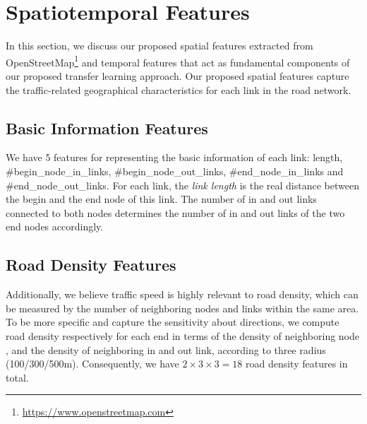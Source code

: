 \section{Spatiotemporal Features}
In this section, we discuss our proposed spatial features extracted from OpenStreetMap\footnote{\url{https://www.openstreetmap.com}} and temporal features that act as fundamental components of our proposed transfer learning approach. 
Our proposed spatial features capture the traffic-related geographical characteristics for each link in the  road network.

\subsection{Basic Information Features} 
We have 5 features for representing the basic information of each link: 
length, \#begin\_node\_in\_links, \#begin\_node\_out\_links, \#end\_node\_in\_links and \#end\_node\_out\_links.
For each link, the \textit{link length} is the real distance between the begin and the end node of this link. 
The number of in and out links connected to both nodes determines the number of in and out links of the two end nodes accordingly.


\subsection{Road Density Features}
Additionally, we believe traffic speed is highly relevant to road density, which can be measured by the number of neighboring nodes and links within the same area.
To be more specific and capture the sensitivity about directions, we compute road density respectively for each end in terms of the density of neighboring node , and the density of neighboring in and out link,  according to three radius (100/300/500m).
Consequently, we have $2 \times 3 \times 3 = 18$ road density features in total.
%


